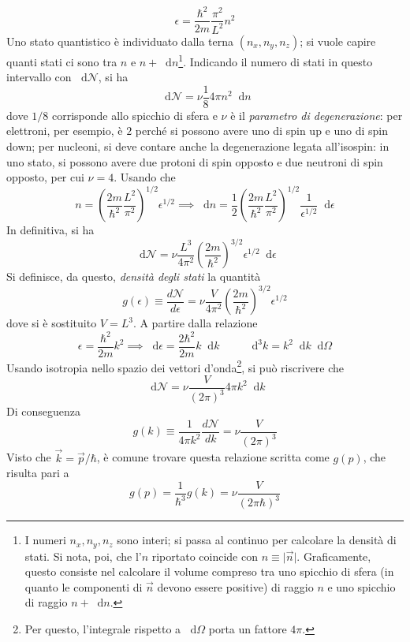 \documentclass[11pt, a4paper]{scrartcl}
\theoremstyle{style}
\newcommand{\dd}{\mathop{}\!\mathrm{d}}
\numberwithin{equation}{subsection}
\begin{document}
\begin{equation}
	\epsilon  = \frac{\hbar ^2}{2m}\frac{\pi^2}{L^2}n^2
\end{equation}
Uno stato quantistico \`e individuato dalla terna $(n_x,n_y,n_z)$; si vuole capire quanti stati ci sono tra $n$ e $n+\dd n$\footnote{I numeri $n_x,n_y,n_z$ sono interi; si passa al continuo per calcolare la densit\`a di stati. Si nota, poi, che l'$n$ riportato coincide con $n\equiv \lvert \vec{n} \rvert $. Graficamente, questo consiste nel calcolare il volume compreso tra uno spicchio di sfera (in quanto le componenti di $\vec{n}$ devono essere positive) di raggio $n$ e uno spicchio di raggio $n +\dd n$.}. 
Indicando il numero di stati in questo intervallo con $\dd \mathcal{N}$, si ha
\[
\dd \mathcal{N}  = \nu \frac{1}{8} 4 \pi n^2 \dd n
\] 
dove $1 / 8$ corrisponde allo spicchio di sfera e $\nu $ \`e il \textit{parametro di degenerazione}: per elettroni, per esempio, \`e $2$ perch\'e si possono avere uno di spin up e uno di spin down; per nucleoni, si deve contare anche la degenerazione legata all'isospin: in uno stato, si possono avere due protoni di spin opposto e due neutroni di spin opposto, per cui $\nu = 4$.
Usando che
\[
n = \left(\frac{2m}{\hbar ^2} \frac{L^2}{\pi^2}\right)^{1 / 2} \epsilon  ^{1 / 2} \implies \dd n = \frac{1}{2} \left(\frac{2m}{\hbar ^2} \frac{L^2}{\pi^2}\right) ^{1 / 2} \frac{1}{\epsilon ^{1 / 2}}\dd \epsilon 
\] 
In definitiva, si ha
\begin{equation}
	\dd \mathcal{N} = \nu  \frac{L^3}{4\pi ^2} \left(\frac{2m}{\hbar ^2}\right) ^{3 / 2} \epsilon^{1 / 2} \dd \epsilon 
\end{equation}
Si definisce, da questo, \textit{densit\`a degli stati} la quantit\`a
\begin{equation}
	g(\epsilon ) \equiv \frac{d \mathcal{N} }{d \epsilon }  =\nu  \frac{V}{4\pi ^2} \left(\frac{2m}{\hbar ^2}\right) ^{3 / 2} \epsilon ^{1 / 2} 
\end{equation}
dove si \`e sostituito $V = L^3$.
A partire dalla relazione
\[
\epsilon  = \frac{\hbar ^2}{2m}k^2\implies \dd \epsilon  =  \frac{2\hbar ^2}{2m} k \dd k \hspace{1cm} \dd ^3 k = k^2 \dd k\dd \Omega 
\] 
Usando isotropia nello spazio dei vettori d'onda\footnote{Per questo, l'integrale rispetto a $\dd \Omega $ porta un fattore $4\pi$.}, si pu\`o riscrivere che
\[
\dd \mathcal{N} = \nu  \frac{V}{(2\pi)^3} 4 \pi k^2 \dd k
\] 
Di conseguenza
\begin{equation}
	g(k) \equiv \frac{1}{4\pi k^2} \frac{d \mathcal{N} }{d k} = \nu  \frac{V}{(2\pi)^3}
\end{equation}
Visto che $\vec{k} = \vec{p}/\hbar $, \`e comune trovare questa relazione scritta come $g(p)$, che risulta pari a 
\begin{equation}
	g(p) = \frac{1}{\hbar ^3} g(k) = \nu  \frac{V}{(2\pi \hbar )^3}
\end{equation}
\end{document}
